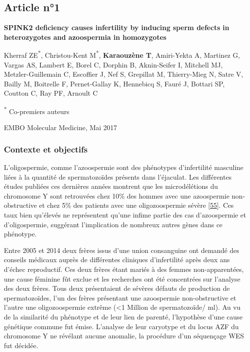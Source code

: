 \documentclass[12pt,a4paper,twoside]{ugathesis}
\theoremstyle{definition}
\theoremstyle{definition}
\theoremstyle{definition}
\theoremstyle{remark}
\begin{document}
\newpage

\newpage  

\subsection{Article n°1}\label{article-n1}

\textbf{SPINK2 deficiency causes infertility by inducing sperm defects
in heterozygotes and azoospermia in homozygotes}

Kherraf ZE\textsuperscript{*}, Christou-Kent M\textsuperscript{*},
\textbf{Karaouzène T}, Amiri-Yekta A, Martinez G, Vargas AS, Lambert E,
Borel C, Dorphin B, Aknin-Seifer I, Mitchell MJ, Metzler-Guillemain C,
Escoffier J, Nef S, Grepillat M, Thierry-Mieg N, Satre V, Bailly M,
Boitrelle F, Pernet-Gallay K, Hennebicq S, Fauré J, Bottari SP, Coutton
C, Ray PF, Arnoult C

\textsuperscript{*} Co-premiers auteurs

EMBO Molecular Medicine, Mai 2017

\newpage

\subsubsection{Contexte et objectifs}\label{contexte-et-objectifs}

L'oligospermie, comme l'azoospermie sont des phénotypes d'infertilité
masculine liées à la quantité de spermatozoïdes présents dans
l'éjaculat. Les différentes études publiées ces dernières années
montrent que les microdélétions du chromosome Y sont retrouvées chez
10\% des hommes avec une azoospermie non-obstructive et chez 5\% des
patients avec une oligozoospermie sévère
{[}\protect\hyperlink{ref-Hotaling2014}{55}{]}. Ces taux bien qu'élevés
ne représentent qu'une infime partie des cas d'azoospermie et
d'oligospermie, suggérant l'implication de nombreux autres gènes dans ce
phénotype.

Entre 2005 et 2014 deux frères issus d'une union consanguine ont demandé
des conseils médicaux auprès de différentes cliniques d'infertilité
après deux ans d'échec reproductif. Ces deux frères étant mariés à des
femmes non-apparentées, une cause féminine fût exclue et les recherches
ont été concentrées sur l'analyse des deux frères. Tous deux
présentaient de sévères défauts de production de spermatozoïdes, l'un
des frères présentant une azoospermie non-obstructive et l'autre une
oligozoospermie extrême (\textless{}1 Million de spermatozoïde/ ml). Au
vu de la similarité du phénotype et de leur lien de parenté, l'hypothèse
d'une cause génétique commune fut émise. L'analyse de leur caryotype et
du locus AZF du chromosome Y ne révélant aucune anomalie, la procédure
d'un séquençage WES fut décidée.
\end{document}
